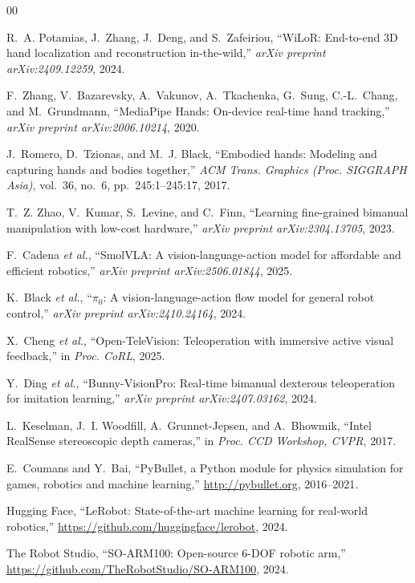 \documentclass[10pt,journal]{IEEEtran}
\begin{document}
\begin{thebibliography}{00}

R.~A. Potamias, J.~Zhang, J.~Deng, and S.~Zafeiriou,
``WiLoR: End-to-end 3D hand localization and reconstruction in-the-wild,''
\emph{arXiv preprint arXiv:2409.12259}, 2024.

F.~Zhang, V.~Bazarevsky, A.~Vakunov, A.~Tkachenka, G.~Sung, C.-L.~Chang,
and M.~Grundmann,
``MediaPipe Hands: On-device real-time hand tracking,''
\emph{arXiv preprint arXiv:2006.10214}, 2020.

J.~Romero, D.~Tzionas, and M.~J. Black,
``Embodied hands: Modeling and capturing hands and bodies together,''
\emph{ACM Trans. Graphics (Proc. SIGGRAPH Asia)},
vol.~36, no.~6, pp.~245:1--245:17, 2017.

T.~Z. Zhao, V.~Kumar, S.~Levine, and C.~Finn,
``Learning fine-grained bimanual manipulation with low-cost hardware,''
\emph{arXiv preprint arXiv:2304.13705}, 2023.

F.~Cadena \emph{et al.},
``SmolVLA: A vision-language-action model for affordable and efficient
robotics,''
\emph{arXiv preprint arXiv:2506.01844}, 2025.

K.~Black \emph{et al.},
``$\pi_0$: A vision-language-action flow model for general robot control,''
\emph{arXiv preprint arXiv:2410.24164}, 2024.

X.~Cheng \emph{et al.},
``Open-TeleVision: Teleoperation with immersive active visual feedback,''
in \emph{Proc. CoRL}, 2025.

Y.~Ding \emph{et al.},
``Bunny-VisionPro: Real-time bimanual dexterous teleoperation for
imitation learning,''
\emph{arXiv preprint arXiv:2407.03162}, 2024.

L.~Keselman, J.~I. Woodfill, A.~Grunnet-Jepsen, and A.~Bhowmik,
``Intel RealSense stereoscopic depth cameras,''
in \emph{Proc. CCD Workshop, CVPR}, 2017.

E.~Coumans and Y.~Bai,
``PyBullet, a Python module for physics simulation for games, robotics
and machine learning,''
\url{http://pybullet.org}, 2016--2021.

Hugging Face,
``LeRobot: State-of-the-art machine learning for real-world robotics,''
\url{https://github.com/huggingface/lerobot}, 2024.

The Robot Studio,
``SO-ARM100: Open-source 6-DOF robotic arm,''
\url{https://github.com/TheRobotStudio/SO-ARM100}, 2024.

\end{thebibliography}
\end{document}
